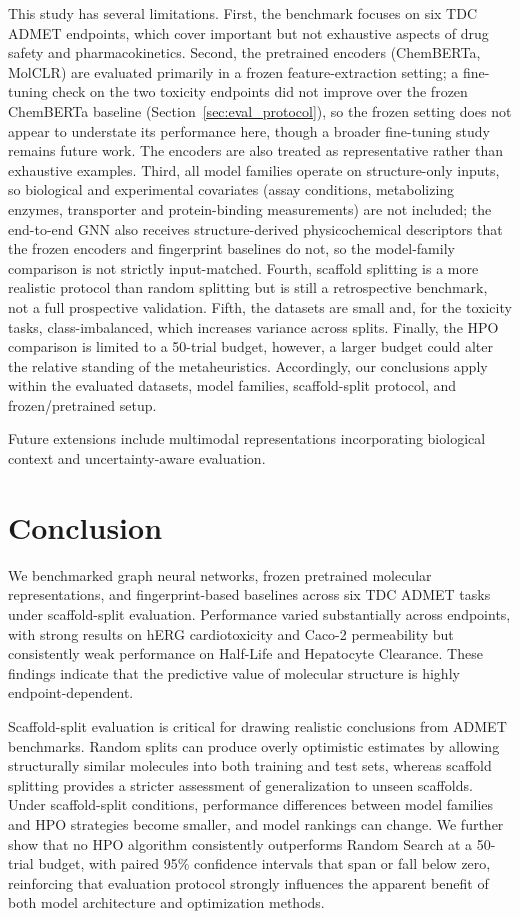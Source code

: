 \documentclass[journal]{IEEEtran}
\begin{document}
This study has several limitations. First, the benchmark focuses on six TDC ADMET endpoints, which cover important but not exhaustive aspects of drug safety and pharmacokinetics. Second, the pretrained encoders (ChemBERTa, MolCLR) are evaluated primarily in a frozen feature-extraction setting; a fine-tuning check on the two toxicity endpoints did not improve over the frozen ChemBERTa baseline (Section~\ref{sec:eval_protocol}), so the frozen setting does not appear to understate its performance here, though a broader fine-tuning study remains future work. The encoders are also treated as representative rather than exhaustive examples. Third, all model families operate on structure-only inputs, so biological and experimental covariates (assay conditions, metabolizing enzymes, transporter and protein-binding measurements) are not included; the end-to-end GNN also receives structure-derived physicochemical descriptors that the frozen encoders and fingerprint baselines do not, so the model-family comparison is not strictly input-matched. Fourth, scaffold splitting is a more realistic protocol than random splitting but is still a retrospective benchmark, not a full prospective validation. Fifth, the datasets are small and, for the toxicity tasks, class-imbalanced, which increases variance across splits. Finally, the HPO comparison is limited to a 50-trial budget, however, a larger budget could alter the relative standing of the metaheuristics. Accordingly, our conclusions apply within the evaluated datasets, model families, scaffold-split protocol, and frozen/pretrained setup.

Future extensions include multimodal representations incorporating biological context and uncertainty-aware evaluation.


\section{Conclusion}
\label{sec:conclusion}

We benchmarked graph neural networks, frozen pretrained molecular representations, and fingerprint-based baselines across six TDC ADMET tasks under scaffold-split evaluation. Performance varied substantially across endpoints, with strong results on hERG cardiotoxicity and Caco-2 permeability but consistently weak performance on Half-Life and Hepatocyte Clearance. These findings indicate that the predictive value of molecular structure is highly endpoint-dependent.

Scaffold-split evaluation is critical for drawing realistic conclusions from ADMET benchmarks. Random splits can produce overly optimistic estimates by allowing structurally similar molecules into both training and test sets, whereas scaffold splitting provides a stricter assessment of generalization to unseen scaffolds. Under scaffold-split conditions, performance differences between model families and HPO strategies become smaller, and model rankings can change. We further show that no HPO algorithm consistently outperforms Random Search at a 50-trial budget, with paired 95\% confidence intervals that span or fall below zero, reinforcing that evaluation protocol strongly influences the apparent benefit of both model architecture and optimization methods.
\end{document}
